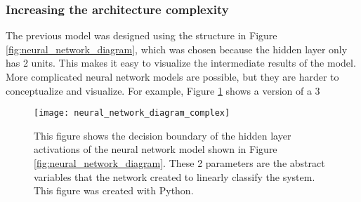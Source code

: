 \subsubsection{Increasing the architecture complexity}
The previous model was designed using the structure in Figure \ref{fig:neural_network_diagram}, which was chosen because the hidden layer only has 2 units.  This makes it easy to visualize the intermediate results of the model.  More complicated neural network models are possible, but they are harder to conceptualize and visualize.  For example, Figure \ref{fig:neural_network_diagram_complex} shows a version of a 3 

\begin{figure}
\centering
\texttt{[image: neural\_network\_diagram\_complex]}
\decoRule
\caption{This figure shows the decision boundary of the hidden layer activations of the neural network model shown in Figure \ref{fig:neural_network_diagram}.  These 2 parameters are the abstract variables that the network created to linearly classify the system. This figure was created with Python.}
\label{fig:neural_network_diagram_complex}
\end{figure}



